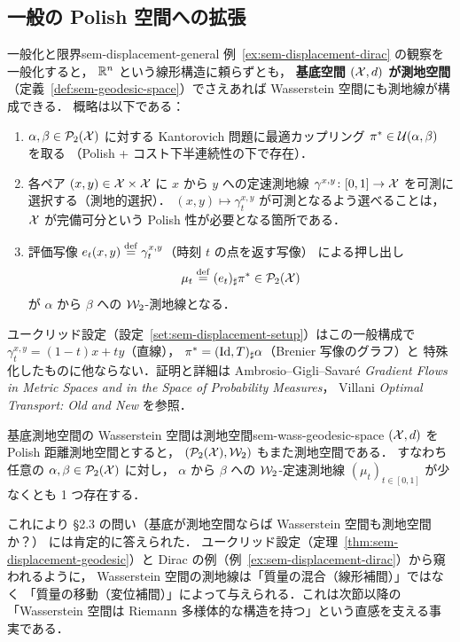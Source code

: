 \subsection{一般の Polish 空間への拡張}

\begin{remark}{一般化と限界}{sem-displacement-general}
  例~\ref{ex:sem-displacement-dirac} の観察を一般化すると，
  $\mathbb{R}^n$ という線形構造に頼らずとも，
  \textbf{基底空間 $(\mathcal{X}, d)$ が測地空間}（定義~\ref{def:sem-geodesic-space}）でさえあれば
  Wasserstein 空間にも測地線が構成できる．
  概略は以下である：
  \begin{enumerate}
    \item[\textup{(a)}]
      $\alpha, \beta \in \mathcal{P}_2(\mathcal{X})$ に対する Kantorovich 問題に最適カップリング
      $\pi^* \in \mathcal{U}(\alpha, \beta)$ を取る
      （Polish + コスト下半連続性の下で存在）．
    \item[\textup{(b)}]
      各ペア $(x, y) \in \mathcal{X} \times \mathcal{X}$ に $x$ から $y$ への定速測地線
      $\gamma^{x, y} \colon [0, 1] \to \mathcal{X}$ を可測に選択する（測地的選択）．
      $(x, y) \mapsto \gamma_t^{x, y}$ が可測となるよう選べることは，
      $\mathcal{X}$ が完備可分という Polish 性が必要となる箇所である．
    \item[\textup{(c)}]
      評価写像 $e_t(x, y) \overset{\mathrm{def}}{=} \gamma_t^{x, y}$（時刻 $t$ の点を返す写像）
      による押し出し
      \[
        \mu_t \overset{\mathrm{def}}{=} (e_t)_\sharp \pi^* \in \mathcal{P}_2(\mathcal{X})
      \]
      が $\alpha$ から $\beta$ への $\mathcal{W}_2$-測地線となる．
  \end{enumerate}
  ユークリッド設定（設定~\ref{set:sem-displacement-setup}）はこの一般構成で
  $\gamma_t^{x, y} = (1 - t) x + t y$（直線），
  $\pi^* = (\operatorname{Id}, T)_\sharp \alpha$（Brenier 写像のグラフ）と
  特殊化したものに他ならない．証明と詳細は Ambrosio--Gigli--Savar\'{e}
  \textit{Gradient Flows in Metric Spaces and in the Space of Probability Measures}，
  Villani \textit{Optimal Transport: Old and New} を参照．
\end{remark}

\begin{theorem}{基底測地空間の Wasserstein 空間は測地空間}{sem-wass-geodesic-space}
  $(\mathcal{X}, d)$ を Polish 距離測地空間とすると，
  $(\mathcal{P}_2(\mathcal{X}), \mathcal{W}_2)$ もまた測地空間である．
  すなわち任意の $\alpha, \beta \in \mathcal{P}_2(\mathcal{X})$ に対し，
  $\alpha$ から $\beta$ への $\mathcal{W}_2$-定速測地線
  $(\mu_t)_{t \in [0, 1]}$ が少なくとも 1 つ存在する．
\end{theorem}

これにより §2.3 の問い（基底が測地空間ならば Wasserstein 空間も測地空間か？）
には肯定的に答えられた．
ユークリッド設定（定理~\ref{thm:sem-displacement-geodesic}）と
Dirac の例（例~\ref{ex:sem-displacement-dirac}）から窺われるように，
Wasserstein 空間の測地線は「質量の混合（線形補間）」ではなく
「質量の移動（変位補間）」によって与えられる．これは次節以降の
「Wasserstein 空間は Riemann 多様体的な構造を持つ」という直感を支える事実である．

